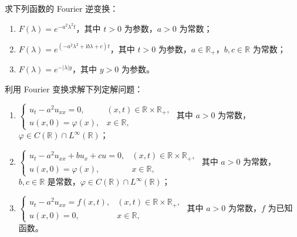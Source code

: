 \documentclass[../../main.tex]{subfiles}%
\begin{document}
\begin{example}
求下列函数的 Fourier 逆变换：
\begin{enumerate}[(1)]
\item $F(\lambda)=e^{-a^2\lambda^2 t}$，其中 $t>0$ 为参数，$a>0$ 为常数；
\item $F(\lambda)=e^{(-a^2\lambda^2+\mathrm{i}b\lambda+c)t}$，其中 $t>0$ 为参数，$a\in\mathbb{R}_+$，$b,c\in\mathbb{R}$ 为常数；
\item $F(\lambda)=e^{-|\lambda|y}$，其中 $y>0$ 为参数。
\end{enumerate}
\end{example}

\begin{example}
利用 Fourier 变换求解下列定解问题：
\begin{enumerate}[(1)]
\item $\begin{cases}
u_t-a^2u_{xx}=0, & (x,t)\in\mathbb{R}\times\mathbb{R}_+,\\
u(x,0)=\varphi(x), & x\in\mathbb{R},
\end{cases}$
其中 $a>0$ 为常数，$\varphi\in C(\mathbb{R})\cap L^\infty(\mathbb{R})$；
\item $\begin{cases}
u_t-a^2u_{xx}+bu_x+cu=0, & (x,t)\in\mathbb{R}\times\mathbb{R}_+,\\
u(x,0)=\varphi(x), & x\in\mathbb{R},
\end{cases}$
其中 $a>0$ 为常数，$b,c\in\mathbb{R}$ 是常数，$\varphi\in C(\mathbb{R})\cap L^\infty(\mathbb{R})$；
\item $\begin{cases}
u_t-a^2u_{xx}=f(x,t), & (x,t)\in\mathbb{R}\times\mathbb{R}_+,\\
u(x,0)=0, & x\in\mathbb{R},
\end{cases}$
其中 $a>0$ 为常数，$f$ 为已知函数。
\end{enumerate}
\end{example}
\end{document}
